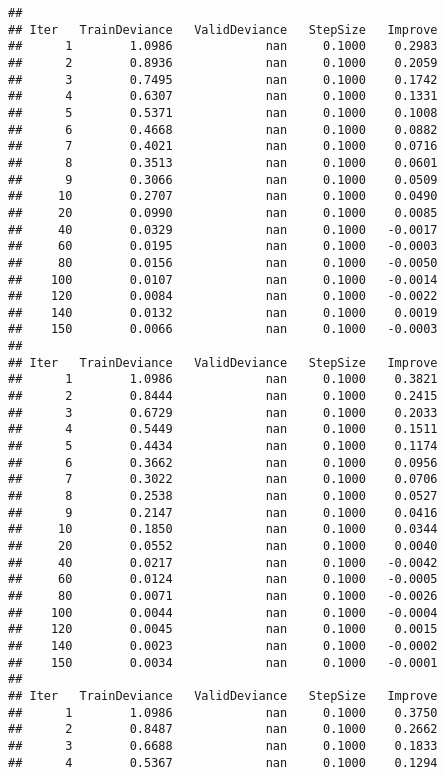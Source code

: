 \documentclass[
]{article}
\begin{document}
\begin{verbatim}
## 
## Iter   TrainDeviance   ValidDeviance   StepSize   Improve
##      1        1.0986             nan     0.1000    0.2983
##      2        0.8936             nan     0.1000    0.2059
##      3        0.7495             nan     0.1000    0.1742
##      4        0.6307             nan     0.1000    0.1331
##      5        0.5371             nan     0.1000    0.1008
##      6        0.4668             nan     0.1000    0.0882
##      7        0.4021             nan     0.1000    0.0716
##      8        0.3513             nan     0.1000    0.0601
##      9        0.3066             nan     0.1000    0.0509
##     10        0.2707             nan     0.1000    0.0490
##     20        0.0990             nan     0.1000    0.0085
##     40        0.0329             nan     0.1000   -0.0017
##     60        0.0195             nan     0.1000   -0.0003
##     80        0.0156             nan     0.1000   -0.0050
##    100        0.0107             nan     0.1000   -0.0014
##    120        0.0084             nan     0.1000   -0.0022
##    140        0.0132             nan     0.1000    0.0019
##    150        0.0066             nan     0.1000   -0.0003
## 
## Iter   TrainDeviance   ValidDeviance   StepSize   Improve
##      1        1.0986             nan     0.1000    0.3821
##      2        0.8444             nan     0.1000    0.2415
##      3        0.6729             nan     0.1000    0.2033
##      4        0.5449             nan     0.1000    0.1511
##      5        0.4434             nan     0.1000    0.1174
##      6        0.3662             nan     0.1000    0.0956
##      7        0.3022             nan     0.1000    0.0706
##      8        0.2538             nan     0.1000    0.0527
##      9        0.2147             nan     0.1000    0.0416
##     10        0.1850             nan     0.1000    0.0344
##     20        0.0552             nan     0.1000    0.0040
##     40        0.0217             nan     0.1000   -0.0042
##     60        0.0124             nan     0.1000   -0.0005
##     80        0.0071             nan     0.1000   -0.0026
##    100        0.0044             nan     0.1000   -0.0004
##    120        0.0045             nan     0.1000    0.0015
##    140        0.0023             nan     0.1000   -0.0002
##    150        0.0034             nan     0.1000   -0.0001
## 
## Iter   TrainDeviance   ValidDeviance   StepSize   Improve
##      1        1.0986             nan     0.1000    0.3750
##      2        0.8487             nan     0.1000    0.2662
##      3        0.6688             nan     0.1000    0.1833
##      4        0.5367             nan     0.1000    0.1294

\end{verbatim}
\end{document}
